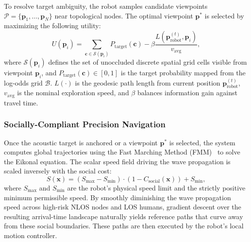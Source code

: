 To resolve target ambiguity, the robot samples candidate viewpoints $\mathcal{P} = \{\mathbf{p}_1, \dots, \mathbf{p}_N\}$ near topological nodes. The optimal viewpoint $\mathbf{p}^*$ is selected by maximizing the following utility:
\begin{equation}
    U(\mathbf{p}_i) = \sum_{\mathbf{c} \in \mathcal{S}(\mathbf{p}_i)} P_{\mathrm{target}}(\mathbf{c}) - \beta \frac{L(\mathbf{p}_{\mathrm{robot}}^{(t)}, \mathbf{p}_i)}{v_{\mathrm{avg}}},
    \label{eq:utility}
\end{equation}
where $\mathcal{S}(\mathbf{p}_i)$ defines the set of unoccluded discrete spatial grid cells visible from viewpoint $\mathbf{p}_i$, and $P_{\mathrm{target}}(\mathbf{c}) \in [0,1]$ is the target probability mapped from the log-odds grid $\mathcal{B}$. $L(\cdot)$ is the geodesic path length from current position $\mathbf{p}_{\mathrm{robot}}^{(t)}$, $v_{\mathrm{avg}}$ is the nominal exploration speed, and $\beta$ balances information gain against travel time.

\subsubsection{Socially-Compliant Precision Navigation}
Once the acoustic target is anchored or a viewpoint $\mathbf{p}^*$ is selected, the system computes global trajectories using the Fast Marching Method (FMM)~\cite{FastMarchingMethods1999} to solve the Eikonal equation. The scalar speed field driving the wave propagation is scaled inversely with the social cost:
\begin{equation}
    S(\mathbf{x}) = (S_{\mathrm{max}} - S_{\mathrm{min}}) \cdot \left(1 - C_{\mathrm{social}}(\mathbf{x})\right) + S_{\mathrm{min}},
    \label{eq:speed}
\end{equation}
where $S_{\mathrm{max}}$ and $S_{\mathrm{min}}$ are the robot's physical speed limit and the strictly positive minimum permissible speed. By smoothly diminishing the wave propagation speed across high-risk NLOS nodes and LOS humans, gradient descent over the resulting arrival-time landscape naturally yields reference paths that curve away from these social boundaries. These paths are then executed by the robot's local motion controller.
